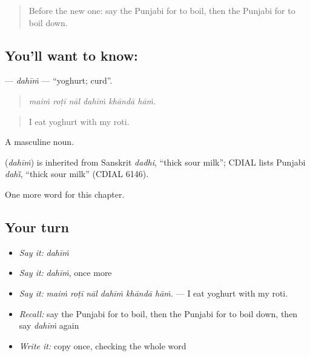 \label{lesson:PA-C237-dahim}



\begin{quote}
Before the new one: say the Punjabi for to boil, then the Punjabi for to boil down.
\end{quote}

\subsection*{You'll want to know: }
\textbf{} — \emph{dahīṁ} — \textquotedblleft{}yoghurt; curd\textquotedblright{}.

\begin{quote}
     
\end{quote}

\begin{quote}
\emph{maiṁ roṭī nāl dahīṁ khāndā hāṁ.}
\end{quote}

\begin{quote}
I eat yoghurt with my roti.
\end{quote}

A masculine noun.

\begin{cousinweb}
\textbf{} (\emph{dahīṁ}) is inherited from Sanskrit \emph{dadhi}, \textquotedblleft{}thick sour milk\textquotedblright{}; CDIAL lists Punjabi \emph{dahī̃}, \textquotedblleft{}thick sour milk\textquotedblright{} (CDIAL 6146).
\end{cousinweb}

\begin{grammarlens}[title={What you've built}]
One more word for this chapter.
\end{grammarlens}

\subsection*{Your turn}
\begin{itemize}
\raggedright
  \item \emph{Say it:} \emph{dahīṁ}
  \item \emph{Say it:} \emph{dahīṁ}, once more
  \item \emph{Say it:} \emph{maiṁ roṭī nāl dahīṁ khāndā hāṁ.} — I eat yoghurt with my roti.
  \item \emph{Recall:} say the Punjabi for to boil, then the Punjabi for to boil down, then say \emph{dahīṁ} again
  \item \emph{Write it:} copy \textbf{} once, checking the whole word
\end{itemize}

